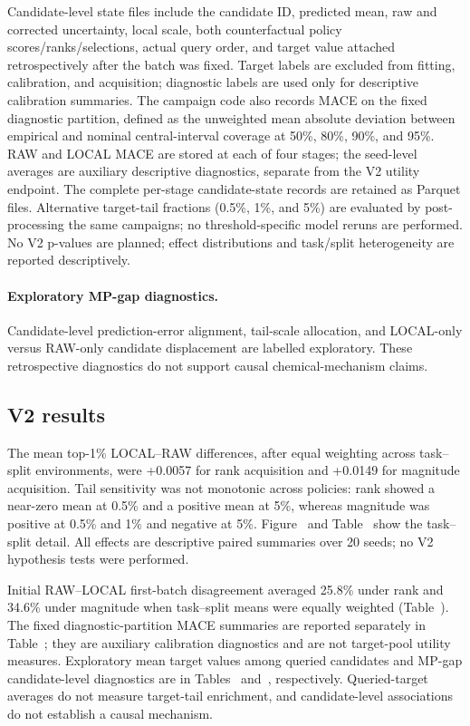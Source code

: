 \documentclass[11pt]{article}
\begin{document}
Candidate-level state files include the candidate ID, predicted mean, raw and corrected uncertainty, local scale, both counterfactual policy scores/ranks/selections, actual query order, and target value attached retrospectively after the batch was fixed. Target labels are excluded from fitting, calibration, and acquisition; diagnostic labels are used only for descriptive calibration summaries. The campaign code also records MACE on the fixed diagnostic partition, defined as the unweighted mean absolute deviation between empirical and nominal central-interval coverage at 50\%, 80\%, 90\%, and 95\%. RAW and LOCAL MACE are stored at each of four stages; the seed-level averages are auxiliary descriptive diagnostics, separate from the V2 utility endpoint. The complete per-stage candidate-state records are retained as Parquet files. Alternative target-tail fractions (0.5\%, 1\%, and 5\%) are evaluated by post-processing the same campaigns; no threshold-specific model reruns are performed. No V2 p-values are planned; effect distributions and task/split heterogeneity are reported descriptively.

\paragraph{Exploratory MP-gap diagnostics.} Candidate-level prediction-error alignment, tail-scale allocation, and LOCAL-only versus RAW-only candidate displacement are labelled exploratory. These retrospective diagnostics do not support causal chemical-mechanism claims.

\subsection{V2 results}
The mean top-1\% LOCAL--RAW differences, after equal weighting across task--split environments, were +0.0057 for rank acquisition and +0.0149 for magnitude acquisition. Tail sensitivity was not monotonic across policies: rank showed a near-zero mean at 0.5\% and a positive mean at 5\%, whereas magnitude was positive at 0.5\% and 1\% and negative at 5\%. Figure~ and Table~ show the task--split detail. All effects are descriptive paired summaries over 20 seeds; no V2 hypothesis tests were performed.

Initial RAW--LOCAL first-batch disagreement averaged 25.8\% under rank and 34.6\% under magnitude when task--split means were equally weighted (Table~). The fixed diagnostic-partition MACE summaries are reported separately in Table~; they are auxiliary calibration diagnostics and are not target-pool utility measures. Exploratory mean target values among queried candidates and MP-gap candidate-level diagnostics are in Tables~ and~, respectively. Queried-target averages do not measure target-tail enrichment, and candidate-level associations do not establish a causal mechanism.
\end{document}
